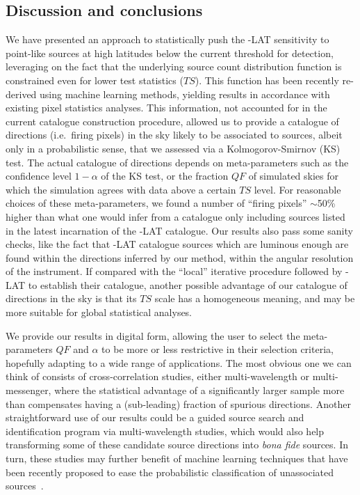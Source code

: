 \subsection{Discussion and conclusions}
\label{sec:catalog:conclusions}


We have presented an approach to statistically push the \Fermi-LAT sensitivity to point-like sources at high latitudes below  the current threshold for detection, leveraging on the fact that the underlying source count  distribution function is constrained even for lower test statistics ($TS$). This function has been recently re-derived using machine learning methods, yielding results in  accordance with existing pixel statistics analyses. This information, not accounted for in the current catalogue construction procedure, allowed us to provide a catalogue of directions (i.e.~firing pixels) in the sky likely to be associated to sources, albeit only in a probabilistic sense, that we assessed via a Kolmogorov-Smirnov (KS) test. The actual catalogue of directions depends on meta-parameters such as the confidence level $1-\alpha$ of the KS test, or the fraction $QF$ of simulated skies for which the simulation agrees with data above a certain $TS$ level. For reasonable choices of these meta-parameters, we found a number of ``firing pixels'' $\sim$50\%  higher than what one would infer from a catalogue only including sources listed in the latest incarnation of the \Fermi-LAT catalogue. Our results also pass some sanity checks, like the fact that \Fermi-LAT catalogue sources which are luminous enough are found within the directions inferred by our method, within the angular resolution of the instrument. If compared with the ``local'' iterative procedure followed by \Fermi-LAT to establish their catalogue, another possible advantage of our catalogue of directions in the sky is that its $TS$ scale has a homogeneous meaning, and may be more suitable for global statistical analyses.  

We provide our results in digital form, allowing the user to select the meta-parameters $QF$ and $\alpha$ to be more or less restrictive in their selection criteria, hopefully adapting to a wide range of applications. The most obvious one we can think of consists of cross-correlation studies, either multi-wavelength or multi-messenger, where the statistical advantage of  a significantly larger sample more than compensates having a (sub-leading) fraction of spurious directions. 
Another straightforward use of our results could be a guided source search and identification program via multi-wavelength studies, which would also help transforming some of these candidate source directions into  \textit{bona fide} sources. In turn, these studies may further benefit of machine learning techniques that have been recently proposed to ease the  probabilistic classification of unassociated sources~\cite{Bhat:2022}.

